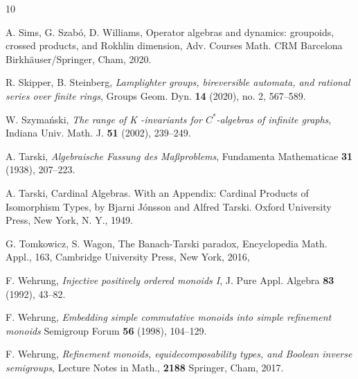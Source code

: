 \documentclass[11pt]{amsart}
\theoremstyle{plain}            %
\theoremstyle{definition}       %
\theoremstyle{definition}       %
\theoremstyle{remark}
\begin{document}
\begin{thebibliography}{10}
	
	  A. Sims, G. Szabó, D. Williams, Operator algebras and dynamics: groupoids, crossed products, and Rokhlin dimension, Adv. Courses Math. CRM Barcelona
	Birkhäuser/Springer, Cham, 2020.
	
	
	 R. Skipper, B. Steinberg, \emph{Lamplighter groups, bireversible automata, and rational series over finite rings},  Groups Geom. Dyn. \textbf{14} (2020), no. 2, 567--589.
	
	
	 W. Szyma\'nski, \emph{The range of  K -invariants for $C^*$-algebras of infinite graphs},	
	Indiana Univ. Math. J. \textbf{51} (2002), 239--249.

    A. Tarski, \emph{Algebraische Fassung des Maßproblems}, Fundamenta Mathematicae \textbf{31} (1938), 207--223.

	 A. Tarski, Cardinal Algebras. With an Appendix: Cardinal
	Products of Isomorphism Types, by Bjarni J\' onsson and Alfred
	Tarski. Oxford University Press, New York, N. Y., 1949.
	
	 G. Tomkowicz, S. Wagon, 
	The Banach-Tarski paradox,
	Encyclopedia Math. Appl., 163,
	Cambridge University Press, New York, 2016,

     F. Wehrung, \emph{Injective positively ordered monoids I}, J. Pure Appl. Algebra \textbf{83} (1992), 43--82.
   
   
    F. Wehrung, \emph{Embedding simple commutative monoids into simple refinement monoids}
    Semigroup Forum \textbf{56} (1998), 104--129.
    
		
	 F. Wehrung, \emph{Refinement monoids, equidecomposability types, and Boolean inverse semigroups}, Lecture Notes in Math., \textbf{2188}
	Springer, Cham, 2017.
	
	
\end{thebibliography}


%
%










































%
%
\end{document}
